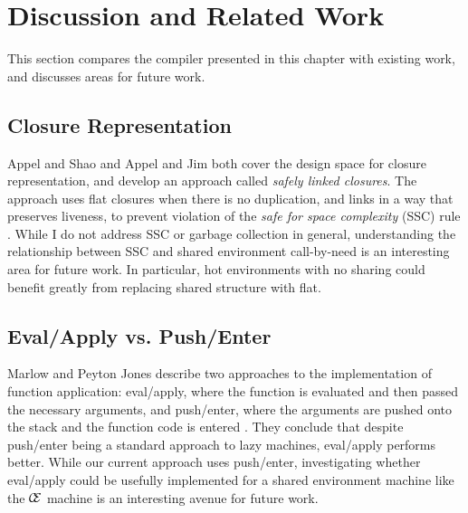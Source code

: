 \section{Discussion and Related Work} \label{sec:disc}

This section compares the compiler presented in this chapter with existing work,
and discusses areas for future work.

\subsection{Closure Representation}
Appel and Shao \cite{shao1994space} and Appel and Jim \cite{appel1988optimizing}
both cover the design space for closure representation, and develop an approach
called \emph{safely linked closures}. The approach uses flat closures when
there is no duplication, and links in a way that preserves liveness, to prevent
violation of the \emph{safe for space complexity} (SSC) rule
\cite{shao1994space}. While I do not address SSC or garbage collection in
general, understanding the relationship between SSC and shared environment
call-by-need is an interesting area for future work. In particular, hot
environments with no sharing could benefit greatly from replacing shared
structure with flat.

\subsection{Eval/Apply vs. Push/Enter}
Marlow and Peyton Jones describe two approaches to the implementation of
function application: eval/apply, where the function is evaluated and then
passed the necessary arguments, and push/enter, where the arguments are pushed
onto the stack and the function code is entered \cite{marlow2006making}. They
conclude that despite push/enter being a standard approach to lazy machines,
eval/apply performs better. While our current approach uses push/enter,
investigating whether eval/apply could be usefully implemented for a shared
environment machine like the $\mathcal{\mathcal{C} \mskip -4mu \mathcal{E}}$
machine is an interesting avenue for future work.

